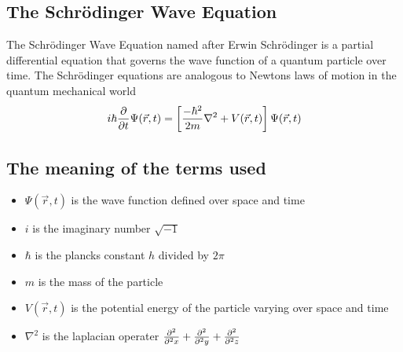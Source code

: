 \subsection{The Schr\"odinger Wave Equation}
{
The Schr\"odinger Wave Equation named after Erwin Schr\"odinger is a partial differential equation that governs the wave function of a quantum particle over time. The Schr\"odinger equations are analogous to Newtons laws of motion in the quantum mechanical world
    \begin{equation}
        i \hbar {\partial \over \partial t} \Psi (\vec{r},t) = \left[{-			        \hbar^2 \over 2m} \nabla^2 + V(\vec{r},t)\right] \Psi (\vec{r},t)
    \end{equation}
}

\subsection{The meaning of the terms used}
{
\begin{itemize}
\item $\Psi (\vec{r},t)$ is the wave function defined over space and time
\item $i$ is the imaginary number $\sqrt{-1}$
\item $\hbar$ is the plancks constant $h$ divided by $2\pi$
\item $m$ is the mass of the particle
\item $V(\vec{r},t)$ is the potential energy of the particle varying over space and time
\item $\nabla^2$ is the laplacian operater ${\partial^2 \over \partial^2 x} + {\partial^2 \over \partial^2 y} + {\partial^2 \over \partial^2 z}$
\end{itemize} 

    
}

